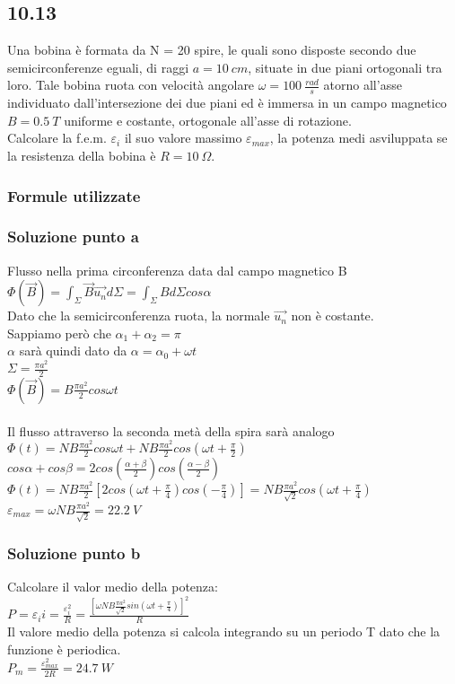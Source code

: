 \documentclass[../../main.tex]{subfiles}
\begin{document}
\subsection*{10.13}
Una bobina è formata da N = 20 spire, le quali sono disposte secondo due semicirconferenze eguali, di raggi $a = 10\ cm$, situate in due piani ortogonali tra loro. Tale bobina ruota con velocità angolare $\omega = 100\ \frac{rad}{s}$ atorno all'asse individuato dall'intersezione dei due piani ed è immersa in un campo magnetico $B= 0.5\ T$ uniforme e costante, ortogonale all'asse di rotazione.\\
Calcolare la f.e.m. $\varepsilon_i$ il suo valore massimo $\varepsilon_{max}$, la potenza medi asviluppata se la resistenza della bobina è $R = 10\ \Omega$.
\subsubsection*{Formule utilizzate}
\subsubsection*{Soluzione punto a}
Flusso nella prima circonferenza data dal campo magnetico B\\
$\Phi(\vec{B}) = \int_\Sigma \vec{B}\vec{u_n}d\Sigma = \int_\Sigma Bd\Sigma cos\alpha$\\
Dato che la semicirconferenza ruota, la normale $\vec{u_n}$ non è costante.\\
Sappiamo però che $\alpha_1 + \alpha_2 = \pi$\\
$\alpha$ sarà quindi dato da $\alpha = \alpha_0 + \omega t$\\
$\Sigma = \frac{\pi a^2}{2}$\\
$\Phi(\vec{B}) = B \frac{\pi a^2}{2}cos\omega t$\\\\
Il flusso attraverso la seconda metà della spira sarà analogo\\
$\Phi(t) = NB\frac{\pi a^2}{2}cos\omega t + NB\frac{\pi a^2}{2}cos\left(\omega t + \frac{\pi}{2}\right)$\\
$cos\alpha + cos\beta = 2cos\left(\frac{\alpha + \beta}{2}\right)cos\left(\frac{\alpha - \beta}{2}\right)$\\
$\Phi(t) = NB\frac{\pi a^2}{2}\left[2cos\left(\omega t+ \frac{\pi}{4}\right)cos\left(-\frac{\pi}{4}\right)\right] = NB\frac{\pi a^2}{\sqrt{2}}cos\left(\omega t+ \frac{\pi}{4}\right)$\\
$\varepsilon_{max} = \omega NB\frac{\pi a^2}{\sqrt{2}}=22.2\ V$
\subsubsection*{Soluzione punto b}
Calcolare il valor medio della potenza:\\
$P = \varepsilon_i i = \frac{\varepsilon_i ^ 2}{R} = \frac{\left[\omega NB \frac{\pi a^2}{\sqrt{2}} sin\left(\omega t +\frac{\pi}{4}\right)\right]^2}{R}$\\
Il valore medio della potenza si calcola integrando su un periodo T dato che la funzione è periodica.\\
$P_m =\frac{\varepsilon_{max}^2}{2R} = 24.7\ W$
\newpage
\end{document}
